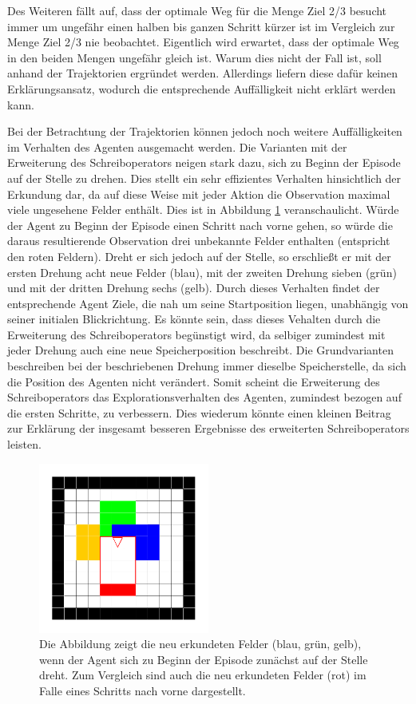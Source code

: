 Des Weiteren fällt auf, dass der optimale Weg für die Menge \glqq Ziel 2/3 besucht\grqq{} immer um ungefähr einen halben bis ganzen Schritt kürzer ist im Vergleich zur Menge \glqq Ziel 2/3 nie beobachtet\grqq{}. Eigentlich wird erwartet, dass der optimale Weg in den beiden Mengen ungefähr gleich ist. Warum dies nicht der Fall ist, soll anhand der Trajektorien ergründet werden. Allerdings liefern diese dafür keinen Erklärungsansatz, wodurch die entsprechende Auffälligkeit nicht erklärt werden kann.

Bei der Betrachtung der Trajektorien können jedoch noch weitere Auffälligkeiten im Verhalten des Agenten ausgemacht werden. Die Varianten mit der Erweiterung des Schreiboperators neigen stark dazu, sich zu Beginn der Episode auf der Stelle zu drehen. Dies stellt ein sehr effizientes Verhalten hinsichtlich der Erkundung dar, da auf diese Weise mit jeder Aktion die Observation maximal viele ungesehene Felder enthält. Dies ist in Abbildung \ref{sample_init_turn} veranschaulicht. Würde der Agent zu Beginn der Episode einen Schritt nach vorne gehen, so würde die daraus resultierende Observation drei unbekannte Felder enthalten (entspricht den roten Feldern). Dreht er sich jedoch auf der Stelle, so erschließt er mit der ersten Drehung acht neue Felder (blau), mit der zweiten Drehung sieben (grün) und mit der dritten Drehung sechs (gelb). Durch dieses Verhalten findet der entsprechende Agent Ziele, die nah um seine Startposition liegen, unabhängig von seiner initialen Blickrichtung. Es könnte sein, dass dieses Vehalten durch die Erweiterung des Schreiboperators begünstigt wird, da selbiger zumindest mit jeder Drehung auch eine neue Speicherposition beschreibt. Die Grundvarianten beschreiben bei der beschriebenen Drehung immer dieselbe Speicherstelle, da sich die Position des Agenten nicht verändert. Somit scheint die Erweiterung des Schreiboperators das Explorationsverhalten des Agenten, zumindest bezogen auf die ersten Schritte, zu verbessern. Dies wiederum könnte einen kleinen Beitrag zur Erklärung der insgesamt besseren Ergebnisse des erweiterten Schreiboperators leisten.

\begin{figure}[ht!]
	\centering
	\includegraphics[keepaspectratio,width=0.5\textwidth]{abbildungen/sample_init_turn.pdf}
	\caption{Die Abbildung zeigt die neu erkundeten Felder (blau, grün, gelb), wenn der Agent sich zu Beginn der Episode zunächst auf der Stelle dreht. Zum Vergleich sind auch die neu erkundeten Felder (rot) im Falle eines Schritts nach vorne dargestellt.}
	\label{sample_init_turn}
\end{figure}

